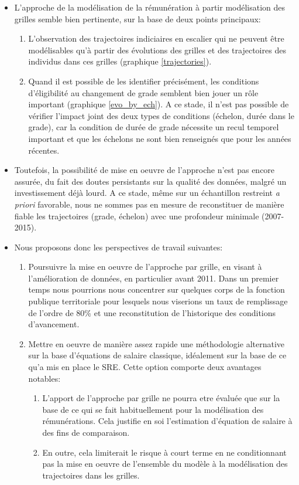 \documentclass[11pt,a4paper]{article}
\begin{document}
\begin{itemize}
\item L'approche de la modélisation de la rémunération à partir modélisation des grilles semble bien pertinente, sur la base de deux points principaux:
\begin{enumerate}
\item L'observation des trajectoires indiciaires \og en escalier \fg{} qui ne peuvent être modélisables qu'à partir des évolutions des grilles et des trajectoires des individus dans ces grilles (graphique \ref{trajectories}).
\item Quand il est possible de les identifier précisément, les conditions d'éligibilité au changement de grade semblent bien jouer un rôle important (graphique \ref{evo_by_ech}). A ce stade, il n'est pas possible de vérifier l'impact joint des deux types de conditions (échelon, durée dans le grade), car la condition de durée de grade nécessite un recul temporel important et que les échelons ne sont bien renseignés que pour les années récentes. 
\end{enumerate}
\item Toutefois, la possibilité de mise en oeuvre de l'approche n'est pas encore assurée, du fait des doutes persistants sur la qualité des données, malgré un investissement déjà lourd. A ce stade, même sur un échantillon restreint \textit{a priori} favorable, nous ne sommes pas en mesure de reconstituer de manière fiable les trajectoires (grade, échelon) avec une profondeur minimale (2007-2015). 

\item Nous proposons donc les perspectives de travail suivantes:
\begin{enumerate}
\item Poursuivre la mise en oeuvre de l'approche par grille, en visant à l'amélioration de données, en particulier avant 2011. Dans un premier temps nous pourrions nous concentrer sur quelques corps de la fonction publique territoriale pour lesquels nous viserions un taux de remplissage de l'ordre de 80\% et une reconstitution de l'historique des conditions d'avancement. 
\item Mettre en oeuvre de manière assez rapide une méthodologie alternative sur la base d'équations de salaire classique, idéalement sur la base de ce qu'a mis en place le SRE. Cette option comporte deux avantages notables:
\begin{enumerate}
\item L'apport de l'approche par grille ne pourra etre évaluée que sur la base de ce qui se fait habituellement pour la modélisation des rémunérations. Cela justifie en soi l'estimation d'équation de salaire à des fins de comparaison. 
\item En outre, cela limiterait le risque à court terme en ne conditionnant pas la mise en oeuvre de l'ensemble du modèle à la modélisation des trajectoires dans les grilles. 
\end{enumerate} 
\end{enumerate}

\end{itemize}
\end{document}
